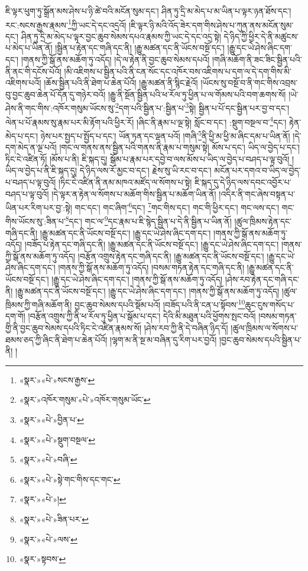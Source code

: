 ཇི་ལྟར་ཕུག་ཏུ་སྒྲོན་མས་ཤེས་པ་ཉི་ཚེ་བའི་མངོན་སུམ་དང་། ཤིན་ཏུ་དྲི་མ་མེད་པ་མ་ཡིན་པ་ལྟར་ཉན་ཐོས་དང་། རང་:སངས་རྒྱས་རྣམས་\footnote{«སྣར་»«པེ་»སངས་རྒྱས་}ཀྱི་ཡང་དེ་དང་འདྲའོ། །ཇི་ལྟར་ཉི་མའི་འོད་ཟེར་དག་གིས་ཤེས་པ་ཀུན་ནས་མངོན་སུམ་དང་། ཤིན་ཏུ་དྲི་མ་མེད་པ་ལྟར་བྱང་ཆུབ་སེམས་དཔའ་རྣམས་ཀྱི་ཡང་དེ་དང་འདྲ་སྟེ། དེ་ཉིད་ཀྱི་ཕྱིར་དེ་ནི་མཚུངས་པ་མེད་པ་ཡིན་ནོ། །སྦྱིན་པ་རྟེན་དང་གཞི་དང་ནི། །རྒྱུ་མཚན་དང་ནི་ཡོངས་བསྔོ་དང་། །རྒྱུ་དང་ཡེ་ཤེས་ཞིང་དག་དང་། །གནས་ཀྱི་སྒོ་ནས་མཆོག་ཏུ་འདོད། །དེ་ལ་རྟེན་ནི་བྱང་ཆུབ་སེམས་དཔའོ། །གཞི་མཆོག་ནི་ཟང་ཟིང་སྦྱིན་པའི་ནི་ནང་གི་དངོས་པོའོ། །མི་འཇིགས་པ་སྦྱིན་པའི་ནི་ངན་སོང་དང་འཁོར་བས་འཇིགས་པ་དག་ལ་དེ་དག་གིས་མི་འཇིགས་པའོ། །ཆོས་སྦྱིན་པའི་ནི་ཐེག་པ་ཆེན་པོའོ། །རྒྱུ་མཚན་ནི་སྙིང་རྗེའོ། །ཡོངས་སུ་བསྔོ་བ་ནི་གང་གིས་འབྲས་བུ་བྱང་ཆུབ་ཆེན་པོ་དོན་དུ་གཉེར་བའོ། །རྒྱུ་ནི་སྔོན་སྦྱིན་པའི་ཕ་རོལ་ཏུ་ཕྱིན་པ་ལ་གོམས་པའི་བག་ཆགས་སོ། །ཡེ་ཤེས་ནི་གང་གིས་:འཁོར་གསུམ་ཡོངས་སུ་\footnote{«སྣར་»འཁོར་གསུམ་«པེ་»འཁོར་གསུམ་ཡོང་}དག་པའི་སྦྱིན་པ་:སྦྱིན་པ་\footnote{«སྣར་»«པེ་»བྱིན་པ་}སྟེ། སྦྱིན་པ་པོ་དང་སྦྱིན་པར་བྱ་བ་དང་། ལེན་པ་པོ་རྣམས་སུ་རྣམ་པར་མི་རྟོག་པའི་ཕྱིར་རོ། །ཞིང་ནི་རྣམ་པ་ལྔ་སྟེ། སློང་བ་དང་། :སྡུག་བསྔལ་བ་\footnote{«སྣར་»«པེ་»སྡུག་བསྔལ་}དང་། རྟེན་མེད་པ་དང་། ཉེས་པར་སྤྱད་པ་སྤྱོད་པ་དང་། ཡོན་ཏན་དང་ལྡན་པའོ། །གཞི་\footnote{«སྣར་»«པེ་»བཞི་}ནི་ཕྱི་མ་ཕྱི་མ་ཞིང་དམ་པ་ཡིན་ནོ། །དེ་དག་མེད་ན་ལྔ་པའོ། །གང་ལ་གནས་ནས་སྦྱིན་པའི་གནས་ནི་རྣམ་པ་གསུམ་སྟེ། མོས་པ་དང་། ཡིད་ལ་བྱེད་པ་དང་། ཏིང་ངེ་འཛིན་ཏོ། །མོས་པ་ནི། ཇི་སྐད་དུ། སྒོམ་པ་རྣམ་པར་དབྱེ་བ་ལས་མོས་པ་ཡིད་ལ་བྱེད་པ་བཤད་པ་ལྟ་བུའོ། །ཡིད་ལ་བྱེད་པ་ནི་ཇི་སྐད་དུ། དེ་ཉིད་ལས་རོ་མྱང་བ་དང་། རྗེས་སུ་ཡི་རང་བ་དང་། མངོན་པར་དགའ་བ་ཡིད་ལ་བྱེད་པ་བཤད་པ་ལྟ་བུའོ། །ཏིང་ངེ་འཛིན་ནི་ནམ་མཁའ་མཛོད་ལ་སོགས་པ་སྟེ། ཇི་སྐད་དུ་དེ་ཉིད་ལས་དབང་འབྱོར་པ་བཤད་པ་ལྟ་བུའོ། །དེ་ལྟར་ན་རྟེན་ལ་སོགས་པ་མཆོག་གིས་སྦྱིན་པ་མཆོག་ཡིན་ནོ། །འདིར་ནི་གང་ཞེས་བསྟན་པ་ཡིན་པར་རིག་པར་བྱ་:སྟེ། གང་དང་། གང་ཞིག་\footnote{«སྣར་»«པེ་»སྟེ་གང་གིས་དང་གང་}དང་། \footnote{«སྣར་»«པེ་»།  }གང་གིས་དང་། གང་གི་ཕྱིར་དང་། གང་ལས་དང་། གང་གིས་ཡོངས་སུ་:ཟིན་པ་\footnote{«སྣར་»«པེ་»ཟིན་པར་}དང་། གང་ལ་\footnote{«སྣར་»«པེ་»ལས་}དང་རྣམ་པ་ཇི་སྙེད་སྦྱིན་པ་དེ་ནི་སྦྱིན་པ་ཡིན་ནོ། །ཚུལ་ཁྲིམས་རྟེན་དང་གཞི་དང་ནི། །རྒྱུ་མཚན་དང་ནི་ཡོངས་བསྔོ་དང་། །རྒྱུ་དང་ཡེ་ཤེས་ཞིང་དག་དང་། །གནས་ཀྱི་སྒོ་ནས་མཆོག་ཏུ་འདོད། །བཟོད་པ་རྟེན་དང་གཞི་དང་ནི། །རྒྱུ་མཚན་དང་ནི་ཡོངས་བསྔོ་དང་། །རྒྱུ་དང་ཡེ་ཤེས་ཞིང་དག་དང་། །གནས་ཀྱི་སྒོ་ནས་མཆོག་ཏུ་འདོད། །བརྩོན་འགྲུས་རྟེན་དང་གཞི་དང་ནི། །རྒྱུ་མཚན་དང་ནི་ཡོངས་བསྔོ་དང་། །རྒྱུ་དང་ཡེ་ཤེས་ཞིང་དག་དང་། །གནས་ཀྱི་སྒོ་ནས་མཆོག་ཏུ་འདོད། །བསམ་གཏན་རྟེན་དང་གཞི་དང་ནི། །རྒྱུ་མཚན་དང་ནི་ཡོངས་བསྔོ་དང་། །རྒྱུ་དང་ཡེ་ཤེས་ཞིང་དག་དང་། །གནས་ཀྱི་སྒོ་ནས་མཆོག་ཏུ་འདོད། །ཤེས་རབ་རྟེན་དང་གཞི་དང་ནི། །རྒྱུ་མཚན་དང་ནི་ཡོངས་བསྔོ་དང་། །རྒྱུ་དང་ཡེ་ཤེས་ཞིང་དག་དང་། །གནས་ཀྱི་སྒོ་ནས་མཆོག་ཏུ་འདོད། །ཚུལ་ཁྲིམས་ཀྱི་གཞི་མཆོག་ནི། བྱང་ཆུབ་སེམས་དཔའི་སྡོམ་པའོ། །བཟོད་པའི་ནི་ངན་པ་སྟོབས་\footnote{«སྣར་»སྟབས་}ཆུང་ངུས་གསོད་པ་དག་གོ། །བརྩོན་འགྲུས་ཀྱི་ནི་ཕ་རོལ་ཏུ་ཕྱིན་པ་སྒོམ་པ་དང་། དེའི་མི་མཐུན་པའི་ཕྱོགས་སྤང་བའོ། །བསམ་གཏན་གྱི་ནི་བྱང་ཆུབ་སེམས་དཔའི་ཏིང་ངེ་འཛིན་རྣམས་སོ། །ཤེས་རབ་ཀྱི་ནི་དེ་བཞིན་ཉིད་དོ། །ཚུལ་ཁྲིམས་ལ་སོགས་པ་ཐམས་ཅད་ཀྱི་ཞིང་ནི་ཐེག་པ་ཆེན་པོའོ། །ལྷག་མ་ནི་སྔ་མ་བཞིན་དུ་རིག་པར་བྱའོ། །བྱང་ཆུབ་སེམས་དཔའི་སྦྱིན་པ་ནི། །
